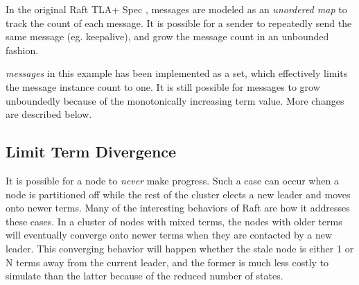 In the original Raft TLA+ Spec \cite{raft_tla}, messages are modeled as an
\textit{unordered map} to track the count of each message. It is possible for a
sender to repeatedly send the same message (eg. keepalive), and grow the 
message count in an unbounded fashion.\newline

\textit{messages} in this example has been implemented as a set, which
effectively limits the message instance count to one. It is still possible for
messages to grow unboundedly because of the monotonically increasing term value.
More changes are described below.

\subsection{Limit Term Divergence} 

It is possible for a node to \textit{never} make progress. Such a case can occur
when a node is partitioned off while the rest of the cluster elects a new leader
and moves onto newer terms. Many of the interesting behaviors of Raft are how it
addresses these cases. In a cluster of nodes with mixed terms, the nodes with
older terms will eventually converge onto newer terms when they are contacted by
a new leader. This converging behavior will happen whether the stale node is
either 1 or N terms away from the current leader, and the former is much less
costly to simulate than the latter because of the reduced number of states.\newline

